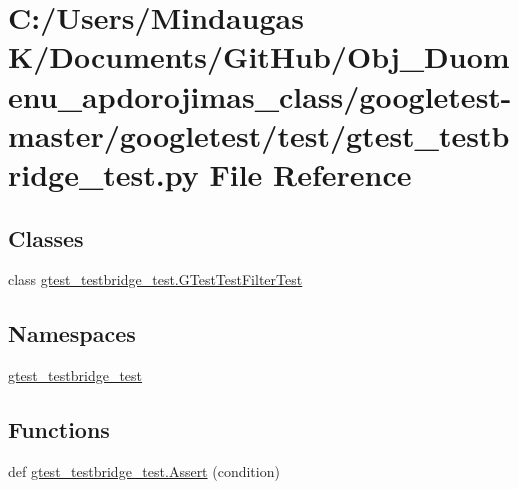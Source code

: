 \hypertarget{googletest-master_2googletest_2test_2gtest__testbridge__test_8py}{}\section{C\+:/\+Users/\+Mindaugas K/\+Documents/\+Git\+Hub/\+Obj\+\_\+\+Duomenu\+\_\+apdorojimas\+\_\+class/googletest-\/master/googletest/test/gtest\+\_\+testbridge\+\_\+test.py File Reference}
\label{googletest-master_2googletest_2test_2gtest__testbridge__test_8py}
\subsection*{Classes}
\begin{DoxyCompactItemize}
\item 
class \mbox{\hyperlink{classgtest__testbridge__test_1_1_g_test_test_filter_test}{gtest\+\_\+testbridge\+\_\+test.\+G\+Test\+Test\+Filter\+Test}}
\end{DoxyCompactItemize}
\subsection*{Namespaces}
\begin{DoxyCompactItemize}
\item 
 \mbox{\hyperlink{namespacegtest__testbridge__test}{gtest\+\_\+testbridge\+\_\+test}}
\end{DoxyCompactItemize}
\subsection*{Functions}
\begin{DoxyCompactItemize}
\item 
def \mbox{\hyperlink{namespacegtest__testbridge__test_a4cadaae26d75cafe8979fb17059b928e}{gtest\+\_\+testbridge\+\_\+test.\+Assert}} (condition)
\end{DoxyCompactItemize}
